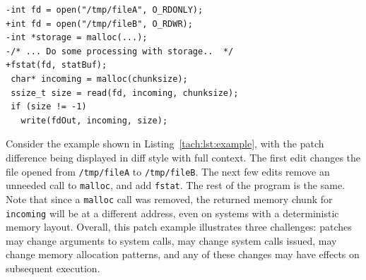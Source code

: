 \begin{lstlisting}[float,caption={Example patch},label={tach:lst:example}]
-int fd = open("/tmp/fileA", O_RDONLY);
+int fd = open("/tmp/fileB", O_RDWR);
-int *storage = malloc(...);
-/* ... Do some processing with storage..  */
+fstat(fd, statBuf);
 char* incoming = malloc(chunksize);
 ssize_t size = read(fd, incoming, chunksize);
 if (size != -1)
   write(fdOut, incoming, size);
\end{lstlisting}

Consider the example shown in Listing~\ref{tach:lst:example}, with the
patch difference being displayed in diff style with full context. The first
edit changes the file opened from \texttt{/tmp/fileA} to
\texttt{/tmp/fileB}. The next few edits remove an unneeded call to
{\tt malloc}, and add {\tt fstat}.  The rest of the program is the
same. Note that since a {\tt malloc} call was removed, the returned
memory chunk for {\tt incoming} will be at a different address, even
on systems with a deterministic memory layout.  Overall, this patch
example illustrates three challenges: patches may change arguments to
system calls, may change system calls issued, may change memory
allocation patterns, and any of these changes may have effects on subsequent
execution.



